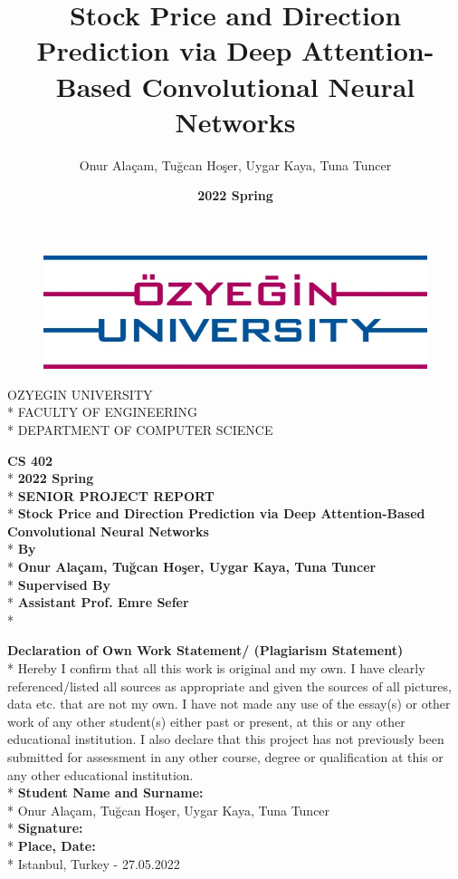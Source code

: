 \documentclass{article}
\title{\textbf{Stock Price and Direction Prediction via Deep Attention-Based Convolutional Neural Networks}}
\author{Onur Alaçam, Tuğcan Hoşer, Uygar Kaya, Tuna Tuncer}
\date{\textbf{2022 Spring}}
\begin{document}
\begin{figure}[h]
    \begin{center}
        \includegraphics[]{assets/OzU.png}
    \end{center}
\end{figure}

\begin{center}
    OZYEGIN UNIVERSITY\\*
    FACULTY OF ENGINEERING\\*
    DEPARTMENT OF COMPUTER SCIENCE
\end{center}

\begin{center}
    \textbf{CS 402}\\* \vspace{0.2cm}
    \textbf{2022 Spring}\\* \vspace{0.4cm}
    \textbf{SENIOR PROJECT REPORT}\\* \vspace{0.6cm}
    \textbf{Stock Price and Direction Prediction via Deep Attention-Based Convolutional Neural Networks}\\* \vspace{0.8cm}
    \textbf{By}\\*
    \textbf{Onur Alaçam, Tuğcan Hoşer, Uygar Kaya, Tuna Tuncer}\\* \vspace{0.6cm}
    \textbf{Supervised By}\\*
    \textbf{Assistant Prof. Emre Sefer}\\* \vspace{0.6cm}
\end{center}
\textbf{Declaration of Own Work Statement/ (Plagiarism Statement)}\\*
Hereby I confirm that all this work is original and my own. I have clearly referenced/listed all sources as appropriate and given the sources of all pictures, data etc. that are not my own. I have not made any use of the essay(s) or other work of any other student(s) either past or present, at this or any other educational institution. I also declare that this project has not previously been submitted for assessment in any other course, degree or qualification at this or any other educational institution.\vspace{0.2cm}\\*
\textbf{Student Name and Surname:}\\* Onur Alaçam, Tuğcan Hoşer, Uygar Kaya, Tuna Tuncer \vspace{0.1cm}\\*
\textbf{Signature:} \vspace{0.9cm}\\*
\textbf{Place, Date:}\\* Istanbul, Turkey - 27.05.2022
\end{document}
